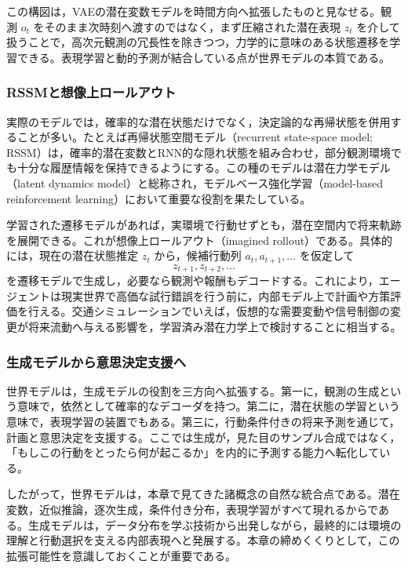 この構図は，VAEの潜在変数モデルを時間方向へ拡張したものと見なせる。観測 \(o_t\) をそのまま次時刻へ渡すのではなく，まず圧縮された潜在表現 \(z_t\) を介して扱うことで，高次元観測の冗長性を除きつつ，力学的に意味のある状態遷移を学習できる。表現学習と動的予測が結合している点が世界モデルの本質である。

\subsubsection{RSSMと想像上ロールアウト}

実際のモデルでは，確率的な潜在状態だけでなく，決定論的な再帰状態を併用することが多い。たとえば再帰状態空間モデル（recurrent state-space model; RSSM）は，確率的潜在変数とRNN的な隠れ状態を組み合わせ，部分観測環境でも十分な履歴情報を保持できるようにする。この種のモデルは潜在力学モデル（latent dynamics model）と総称され，モデルベース強化学習（model-based reinforcement learning）において重要な役割を果たしている。

学習された遷移モデルがあれば，実環境で行動せずとも，潜在空間内で将来軌跡を展開できる。これが想像上ロールアウト（imagined rollout）である。具体的には，現在の潜在状態推定 \(z_t\) から，候補行動列 \(a_t,a_{t+1},\dots\) を仮定して
\begin{equation}
z_{t+1}, z_{t+2}, \dots
\end{equation}
を遷移モデルで生成し，必要なら観測や報酬もデコードする。これにより，エージェントは現実世界で高価な試行錯誤を行う前に，内部モデル上で計画や方策評価を行える。交通シミュレーションでいえば，仮想的な需要変動や信号制御の変更が将来流動へ与える影響を，学習済み潜在力学上で検討することに相当する。

\subsubsection{生成モデルから意思決定支援へ}

世界モデルは，生成モデルの役割を三方向へ拡張する。第一に，観測の生成という意味で，依然として確率的なデコーダを持つ。第二に，潜在状態の学習という意味で，表現学習の装置でもある。第三に，行動条件付きの将来予測を通じて，計画と意思決定を支援する。ここでは生成が，見た目のサンプル合成ではなく，「もしこの行動をとったら何が起こるか」を内的に予測する能力へ転化している。

したがって，世界モデルは，本章で見てきた諸概念の自然な統合点である。潜在変数，近似推論，逐次生成，条件付き分布，表現学習がすべて現れるからである。生成モデルは，データ分布を学ぶ技術から出発しながら，最終的には環境の理解と行動選択を支える内部表現へと発展する。本章の締めくくりとして，この拡張可能性を意識しておくことが重要である。

